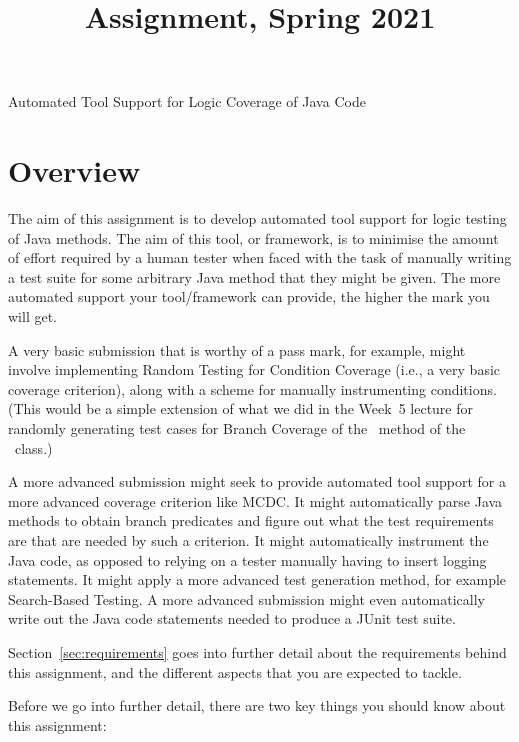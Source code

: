 



\title{Assignment, Spring 2021}{Automated Tool Support for Logic Coverage of Java Code}

\section{Overview}

The aim of this assignment is to develop automated tool support for logic
testing of Java methods. The aim of this tool, or framework, is to minimise the
amount of effort required by a human tester when faced with the task of manually
writing a test suite for some arbitrary Java method that they might be given.
%
The more automated support your tool/framework can provide, the higher the mark
you will get. 

A very basic submission that is worthy of a pass mark, for example, might
involve implementing Random Testing for Condition Coverage (i.e., a very basic
coverage criterion), along with a scheme for manually instrumenting conditions.
(This would be a simple extension of what we did in the Week~5 lecture for
randomly generating test cases for Branch Coverage of the \classifymethod~method
of the \triangleclass~class.)

A more advanced submission might seek to provide automated tool support for a
more advanced coverage criterion like MCDC. It might automatically parse Java
methods to obtain branch predicates and figure out what the test requirements
are that are needed by such a criterion. It might automatically instrument the
Java code, as opposed to relying on a tester manually having to insert logging
statements. It might apply a more advanced test generation method, for example
Search-Based Testing. A more advanced submission might even automatically write
out the Java code statements needed to produce a JUnit test suite. 

Section~\ref{sec:requirements} goes into further detail about the requirements
behind this assignment, and the different aspects that you are expected to
tackle. 

Before we go into further detail, there are two key things you should know about
this assignment:

